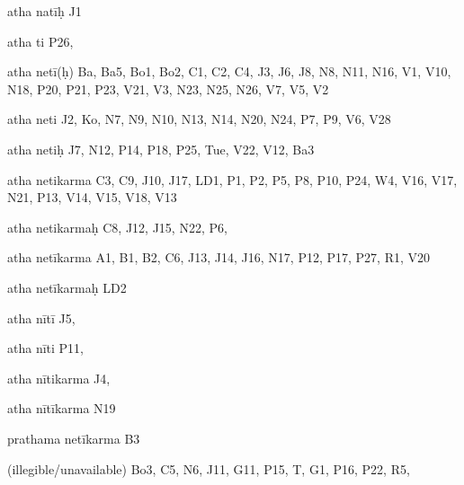 \begin{ekdosis}
\begin{marma}[hp01_055]
\begin{marma}[hp02_009]
\begin{marma}[hp02_011]
\begin{marma}[hp02_29d]
\begin{description}
    \end{description}
 \end{marma}

 \begin{marma}[hp02_30]
\item[atha natīḥ] J1
\item[atha ti] P26, 
\item[atha netī(ḥ)] Ba, Ba5, Bo1, Bo2, C1, C2, C4, J3, J6, J8, N8, N11, N16, V1, V10, N18, P20, P21, P23, V21, V3, N23, N25, N26, V7, V5, V2
\item[atha neti] J2, Ko, N7, N9, N10, N13, N14, N20, N24, P7, P9, V6, V28
\item[atha netiḥ] J7, N12, P14, P18, P25, Tue, V22, V12, Ba3
\item[atha netikarma] C3, C9, J10, J17, LD1, P1, P2, P5, P8, P10, P24, W4, V16, V17, N21, P13, V14, V15, V18, V13
\item[atha netikarmaḥ] C8, J12, J15, N22, P6, 
\item[atha netīkarma] A1, B1, B2, C6, J13, J14, J16, N17, P12, P17, P27, R1, V20
\item[atha netīkarmaḥ] LD2
\item[atha nītī] J5,
\item[atha nīti] P11, 
\item[atha nītikarma] J4,
\item[atha nītīkarma] N19
\item[prathama netīkarma] B3
\item[(illegible/unavailable)] Bo3, C5, N6, J11, G11, P15, T, G1, P16, P22, R5,
  \begin{description}

    \end{description}
 \end{marma}


\end{marma}
\end{marma}
\end{marma}
\end{ekdosis}

